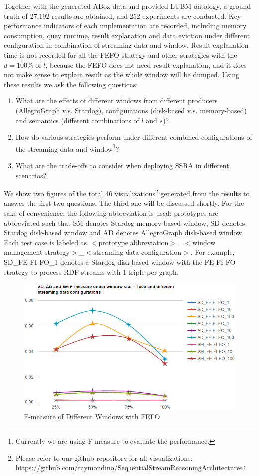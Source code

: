 Together with the generated ABox data and provided LUBM ontology, a ground truth of 27,192 results are obtained, and 252 experiments are conducted.
Key performance indicators of each implementation are recorded, including memory consumption, quey runtime, result explanation and data eviction under different configuration in combination of streaming data and window. 
Result explanation time is not recorded for all the FEFO strategy and other strategies with the $d = 100\%$ of $l$, because the FEFO does not need result explanation, and it does not make sense to explain result as the whole window will be dumped. 
Using these results we ask the following questions:
\begin{enumerate}
	\item What are the effects of different windows from different producers (AllegroGraph v.s. Stardog), configurations (disk-based v.s. memory-based) and semantics (different combinations of $l$ and $s$)?
    \item How do various strategies perform under different combined configurations of the streaming data and window\footnote{Currently we are using F-measure to evaluate the performance.}?
    \item What are the trade-offs to consider when deploying SSRA in different scenarios?
\end{enumerate}

We show two figures of the total 46 visualizations\footnote{Please refer to our github repository for all visualizations: \url{https://github.com/raymondino/SequentialStreamReasoningArchitecture}} generated from the results to answer the first two questions. 
The third one will be discussed shortly. 
For the sake of convenience, the following abbreviation is used: 
prototypes are abbreviated such that SM denotes Stardog memory-based window, SD denotes Stardog disk-based window and AD denotes AllegroGraph disk-based window. 
Each test case is labeled as $<$prototype abbreviation$>$\_$<$window management strategy$>$\_$<$streaming data configuration$>$. 
For example, SD\_FE-FI-FO\_1 denotes a Stardog disk-based window with the FE-FI-FO strategy to process RDF streams with 1 triple per graph.

\begin{figure}[!htbp]
	\centering
	\includegraphics[width=5in]{img/4-ff.png}
	\caption{F-measure of Different Windows with FEFO}
	\label{fig:fefo}
\end{figure}

